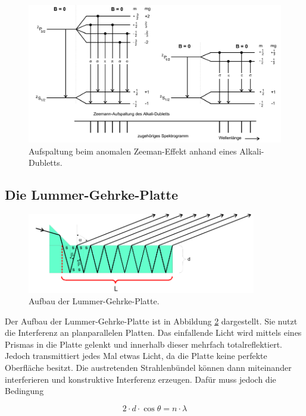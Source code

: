 \begin{figure}[h]
  \includegraphics[width=15cm]{Pics/Alkali.png}
  \caption{Aufspaltung beim anomalen Zeeman-Effekt anhand eines Alkali-Dubletts. \cite{anleitung01}}
  \label{fig:AlkaliBeispiel}
\end{figure}

\newpage

\subsection{Die Lummer-Gehrke-Platte}

\begin{figure}[h]
  \centering
  \includegraphics[width=10cm]{Pics/Lummer.png}
  \caption{Aufbau der Lummer-Gehrke-Platte. \cite{anleitung01}}
  \label{fig:LummerGehrke}
\end{figure}

Der Aufbau der Lummer-Gehrke-Platte ist in Abbildung \ref{fig:LummerGehrke} dargestellt.
Sie nutzt die Interferenz an planparallelen Platten. Das einfallende Licht wird
mittels eines Prismas in die Platte gelenkt und innerhalb dieser mehrfach
totalreflektiert. Jedoch transmittiert jedes Mal etwas Licht, da die Platte keine
perfekte Oberfläche besitzt. Die austretenden Strahlenbündel können dann miteinander
interferieren und konstruktive Interferenz erzeugen. Dafür muss jedoch die
Bedingung

\begin{equation}
  2 \cdot d \cdot \cos{\theta} = n \cdot \lambda
  \label{eqn:Bragg}
\end{equation}

